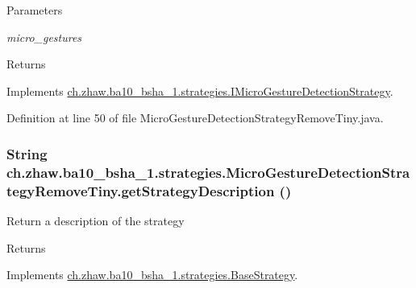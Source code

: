 \begin{DoxyParams}{Parameters}
\item[{\em micro\_\-gestures}]\end{DoxyParams}
\begin{DoxyReturn}{Returns}

\end{DoxyReturn}


Implements \hyperlink{interfacech_1_1zhaw_1_1ba10__bsha__1_1_1strategies_1_1IMicroGestureDetectionStrategy_a8593331fb67e5d4dc890d3db9f2d1b58}{ch.zhaw.ba10\_\-bsha\_\-1.strategies.IMicroGestureDetectionStrategy}.

Definition at line 50 of file MicroGestureDetectionStrategyRemoveTiny.java.\hypertarget{classch_1_1zhaw_1_1ba10__bsha__1_1_1strategies_1_1MicroGestureDetectionStrategyRemoveTiny_a4b884732838b849076ba7563111496d2}{
\subsubsection[{getStrategyDescription}]{\setlength{\rightskip}{0pt plus 5cm}String ch.zhaw.ba10\_\-bsha\_\-1.strategies.MicroGestureDetectionStrategyRemoveTiny.getStrategyDescription ()}}
\label{classch_1_1zhaw_1_1ba10__bsha__1_1_1strategies_1_1MicroGestureDetectionStrategyRemoveTiny_a4b884732838b849076ba7563111496d2}
Return a description of the strategy

\begin{DoxyReturn}{Returns}

\end{DoxyReturn}


Implements \hyperlink{classch_1_1zhaw_1_1ba10__bsha__1_1_1strategies_1_1BaseStrategy_a75fdb36932ad701f6375cc1fe718056b}{ch.zhaw.ba10\_\-bsha\_\-1.strategies.BaseStrategy}.

